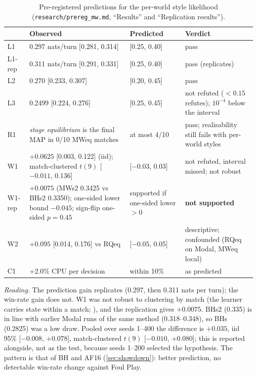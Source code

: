 \documentclass[10pt]{article}
\theoremstyle{plain}
\theoremstyle{definition}
\theoremstyle{remark}
\newcommand{\src}[1]{\path{#1}}
\begin{document}
\begin{table}[!htbp]\centering\small
\caption{Pre-registered predictions for the per-world style likelihood (\texttt{research/prereg\_mw.md}, ``Results'' and
``Replication results'').}\label{tab:mwprereg}
\begin{tabular}{@{}lp{6.6cm}p{2.2cm}p{4.6cm}@{}}\toprule
 & Observed & Predicted & Verdict \\ \midrule
L1 & 0.297 nats/turn [0.281, 0.314] & [0.25, 0.40] & pass \\
L1-rep & 0.311 nats/turn [0.291, 0.331] & [0.25, 0.40] & pass (replicates) \\
L2 & 0.270 [0.233, 0.307] & [0.20, 0.45] & pass \\
L3 & 0.2499 [0.224, 0.276] & [0.25, 0.45] & not refuted ($<0.15$ refutes); $10^{-4}$ below the interval \\
R1 & \emph{stage equilibrium} is the final MAP in 0/10 MWeq matches & at most 4/10 & pass; realisability still fails with per-world styles \\
W1 & $+0.0625$ [0.003, 0.122] (iid); match-clustered $t(9)$ [$-0.011$, 0.136] & [$-0.03$, 0.03] & not refuted, interval missed; not robust \\
W1-rep & $+0.0075$ (MWs2 0.3425 vs BHs2 0.3350); one-sided lower bound $-0.045$; sign-flip one-sided $p=0.45$ & supported if one-sided lower $>0$ & \textbf{not supported} \\
W2 & $+0.095$ [0.014, 0.176] vs RQeq & [$-0.05$, 0.05] & descriptive; confounded (RQeq on Modal, MWeq local) \\
C1 & $+2.0\%$ CPU per decision & within 10\% & as predicted \\ \bottomrule
\end{tabular}\end{table}

\emph{Reading.} The prediction gain replicates (0.297, then 0.311 nats per turn); the win-rate gain does not. W1 was not
robust to clustering by match (the learner carries state within a match; \src{research/mw_w1_verification.md}), and
the replication gives $+0.0075$. BHs2 (0.335) is in line with earlier Modal runs of the same method (0.318--0.348), so BHs
(0.2825) was a low draw. Pooled over seeds 1--400 the difference is $+0.035$, iid 95\% [$-0.008$, $+0.078$],
match-clustered $t(9)$ [$-0.010$, $+0.080$]; this is reported alongside, not as the test, because seeds 1--200 selected
the hypothesis. The pattern is that of BH and AF16 (\cref{sec:showdown}): better prediction, no detectable win-rate change
against Foul Play.
\end{document}
